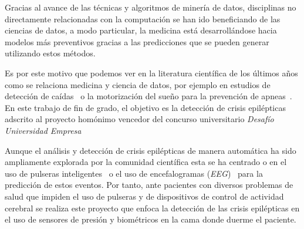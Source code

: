 
Gracias al avance de las técnicas y algoritmos de minería de datos, disciplinas no directamente relacionadas con la computación se han ido beneficiando de las ciencias de datos, a modo particular, la medicina está desarrollándose hacia modelos más preventivos gracias a las predicciones que se pueden generar utilizando estos métodos.

Es por este motivo que podemos ver en la literatura científica de los últimos años como se relaciona medicina y ciencia de datos, por ejemplo en estudios de detección de caídas~\cite{tolkiehn2011fall} o la motorización del sueño para la prevención de apneas~\cite{kortelainen2012sleepmonitoring}. En este trabajo de fin de grado, el objetivo es la detección de crisis epilépticas adscrito al proyecto homónimo vencedor del concurso universitario \textit{Desafío Universidad Empresa}~\cite{radio:radio_amiga_burgos_2018}

Aunque el análisis y detección de crisis epilépticas de manera automática ha sido ampliamente explorada por la comunidad científica esta se ha centrado o en el uso de pulseras inteligentes~\cite{ramgopal2014product_review} o el uso de encefalogramas (\textit{EEG})~\cite{jeppesen2017modified,kumar2014epilepticeeg,tzallas2012review} para la predicción de estos eventos. Por tanto, ante pacientes con diversos problemas de salud que impiden el uso de pulseras y de dispositivos de control de actividad cerebral se realiza este proyecto que enfoca la detección de las crisis epilépticas en el uso de sensores de presión y biométricos en la cama donde duerme el paciente.